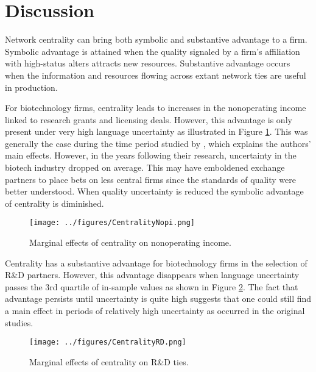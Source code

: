 \section{Discussion}

Network centrality can bring both symbolic and substantive advantage to a firm. Symbolic advantage is attained when the quality signaled by a firm's affiliation with high-status alters attracts new resources. Substantive advantage occurs when the information and resources flowing across extant network ties are useful in production. 

For biotechnology firms, centrality leads to increases in the nonoperating income linked to research grants and licensing deals. However, this advantage is only present under very high language uncertainty as illustrated in Figure \ref{cnopi}. This was generally the case during the time period studied by \citet{powell1999}, which explains the authors' main effects. However, in the years following their research, uncertainty in the biotech industry dropped on average. This may have emboldened exchange partners to place bets on less central firms since the standards of quality were better understood. When quality uncertainty is reduced the symbolic advantage of centrality is diminished.

\begin{figure}
\begin{center}
\texttt{[image: ../figures/CentralityNopi.png]}
\caption[Marginal effects of centrality on nonop. income]{Marginal effects of centrality on nonoperating income.\label{cnopi}}
\end{center}
\end{figure}

Centrality has a substantive advantage for biotechnology firms in the selection of R\&D partners. However, this advantage disappears when language uncertainty passes the 3rd quartile of in-sample values as shown in Figure \ref{crd}. The fact that advantage persists until uncertainty is quite high suggests that one could still find a main effect in periods of relatively high uncertainty as occurred in the original studies.

\begin{figure}
\begin{center}
\texttt{[image: ../figures/CentralityRD.png]}
\caption[Marginal effects of centrality on R\&D]{Marginal effects of centrality on R\&D ties.\label{crd}}
\end{center}
\end{figure}

